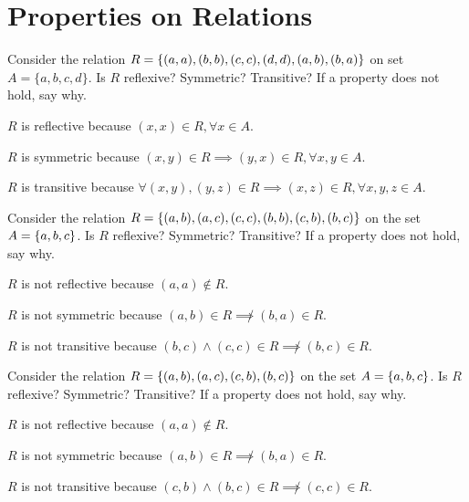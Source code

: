 \documentclass{article}
\begin{document}
\section{Properties on Relations}
\begin{exercise}{}{}{Consider the relation $R=\{(a, a),(b, b),(c, c),(d, d),(a,
				b),(b, a)\}$ on set $A=\{a, b, c, d\}$. Is $R$ reflexive? Symmetric?
		Transitive? If a property does not hold, say why.}
	\tcblower
	\begin{alist}
		\item $R$ is reflective because $(x, x) \in R, \forall x \in A$.
		\item $R$ is symmetric because $(x, y) \in R \implies (y, x) \in R, \forall x,y \in A$.
		\item $R$ is transitive because $\forall (x, y), (y,z) \in R
			\implies (x, z) \in R, \forall x,y,z \in A$.
	\end{alist}
\end{exercise}

\begin{exercise}{}{}{Consider the relation $R=\{(a, b),(a, c),(c, c),(b, b),(c,
				b),(b, c)\}$ on the set $A=\{a, b, c\}$. Is $R$ reflexive? Symmetric?
		Transitive? If a property does not hold, say why.}
	\tcblower
	\begin{alist}
		\item $R$ is not reflective because $(a, a) \not\in R$.
		\item $R$ is not symmetric because $(a, b) \in R \not\implies (b, a) \in R$.
		\item $R$ is not transitive because $(b, c) \land (c, c) \in R \not \implies (b,
			c) \in R$.
	\end{alist}
\end{exercise}

\begin{exercise}{}{}{Consider the relation $R=\{(a, b),(a, c),(c, b),(b, c)\}$
		on the set $A=\{a, b, c\}$. Is $R$ reflexive? Symmetric? Transitive? If a
		property does not hold, say why.}
	\tcblower
	\begin{alist}
		\item $R$ is not reflective because $(a, a) \not\in R$.
		\item $R$ is not symmetric because $(a, b) \in R \not\implies (b, a) \in R$.
		\item $R$ is not transitive because $(c, b) \land (b, c) \in R \not \implies (c, c) \in R$.
	\end{alist}
\end{exercise}{}{}
\end{document}
